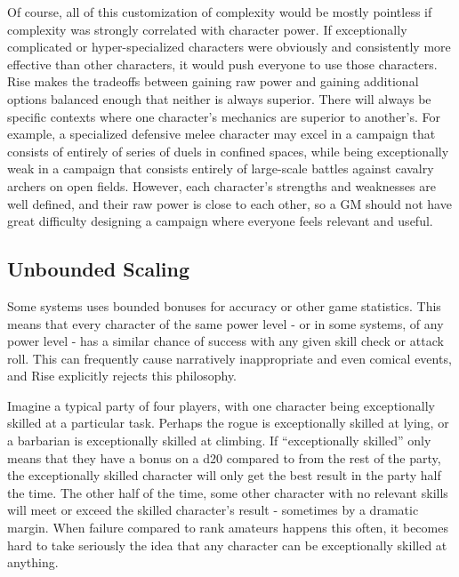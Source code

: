         Of course, all of this customization of complexity would be mostly pointless if complexity was strongly correlated with character power.
        If exceptionally complicated or hyper-specialized characters were obviously and consistently more effective than other characters, it would push everyone to use those characters.
        Rise makes the tradeoffs between gaining raw power and gaining additional options balanced enough that neither is always superior.
        There will always be specific contexts where one character's mechanics are superior to another's.
        For example, a specialized defensive melee character may excel in a campaign that consists of entirely of series of duels in confined spaces, while being exceptionally weak in a campaign that consists entirely of large-scale battles against cavalry archers on open fields.
        However, each character's strengths and weaknesses are well defined, and their raw power is close to each other, so a GM should not have great difficulty designing a campaign where everyone feels relevant and useful.

    \subsection{Unbounded Scaling}
        Some systems uses bounded bonuses for accuracy or other game statistics.
        This means that every character of the same power level - or in some systems, of any power level - has a similar chance of success with any given skill check or attack roll.
        This can frequently cause narratively inappropriate and even comical events, and Rise explicitly rejects this philosophy.

        Imagine a typical party of four players, with one character being exceptionally skilled at a particular task.
        Perhaps the rogue is exceptionally skilled at lying, or a barbarian is exceptionally skilled at climbing.
        If ``exceptionally skilled'' only means that they have a  bonus on a d20 compared to  from the rest of the party, the exceptionally skilled character will only get the best result in the party half the time.
        The other half of the time, some other character with no relevant skills will meet or exceed the skilled character's result - sometimes by a dramatic margin.
        When failure compared to rank amateurs happens this often, it becomes hard to take seriously the idea that any character can be exceptionally skilled at anything.

